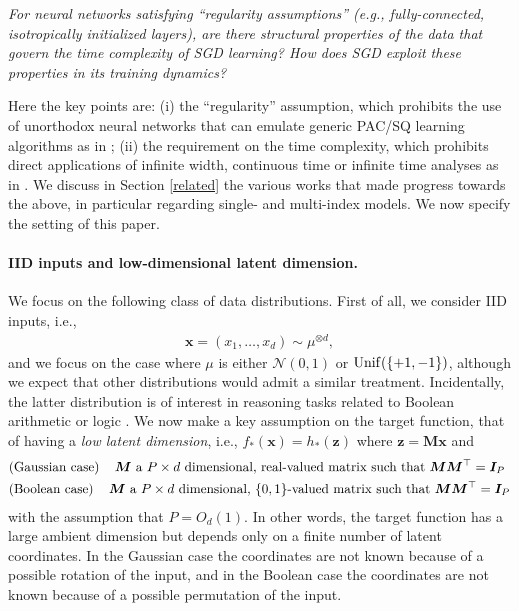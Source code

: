 \documentclass[11pt]{article}
\newcommand{\<}{\langle}
\renewcommand{\>}{\rangle}
\theoremstyle{definition}
\def\bI{{\boldsymbol I}}
\def\bM{{\boldsymbol M}}
\def\bx{{\boldsymbol x}}
\def\bz{{\boldsymbol z}}
\def\Unif{{\rm Unif}}
\def\Unif{{\sf Unif}}
\def\Unif{{\sf Unif}}
\def\bz{{\boldsymbol z}}
\def\bx{{\boldsymbol x}}
\def\Unif{{\rm Unif}}
\def\bz{{\boldsymbol z}}
\begin{document}
\begin{center}
{\em For neural networks satisfying ``regularity assumptions'' (e.g., fully-connected, isotropically initialized layers), are there structural properties of the data that govern the time complexity of SGD learning? How does SGD exploit these properties in its training dynamics?}
\end{center}


Here the key points are: (i) the ``regularity'' assumption, which prohibits the use of unorthodox neural networks that can emulate generic PAC/SQ learning algorithms as in \cite{abbe2020universality,abbe2021power}; (ii) the requirement on the time complexity, which prohibits direct applications of infinite width, continuous time or infinite time analyses as in \cite{chizat2018global,chizat2020implicit}. We discuss in Section \ref{related} the various works that  made progress towards the above, in particular regarding single- and multi-index models. We now specify the setting of this paper.


\paragraph{IID inputs and low-dimensional latent dimension.} 
We focus on the following class of data distributions. First of all, we consider IID inputs, i.e., 
\begin{align}
\bx=(x_1, \dots, x_d) \sim \mu^{\otimes d},
\end{align}
and we focus on the case where $\mu$ is either  $\mathcal{N}(0,1)$ or $\Unif(\{+1,-1\})$, although we expect that other distributions would admit a similar treatment. Incidentally, the latter distribution is of interest in reasoning tasks related to Boolean arithmetic or logic \citep{saxton2019analysing,pvr,l2r}. 
We now make a key assumption on the target function, that of having a {\it low latent dimension}, i.e., $f_*(\bx)=h_*(\bz)$ where $\bz=\bM\bx$ and
\begin{equation}\label{eq:support_bool_gauss}
\begin{aligned}
&\text{(Gaussian case) \,\,\,  $\bM$ a $P \times d$ dimensional, real-valued matrix such that $\bM\bM^{\top}=\bI_P$}\\
&\text{(Boolean case) \,\,\, $\bM$ a $P \times d$ dimensional, $\{0,1\}$-valued matrix such that $\bM\bM^{\top}=\bI_P$}
\end{aligned}
\end{equation}
with the assumption that 
$P=O_d(1)$. In other words, the target function has a large ambient dimension but depends only on a finite number of latent coordinates. In the Gaussian case the coordinates are not known because of a possible rotation of the input, and in the Boolean case the coordinates are not known because of a possible permutation of the input.
\end{document}
